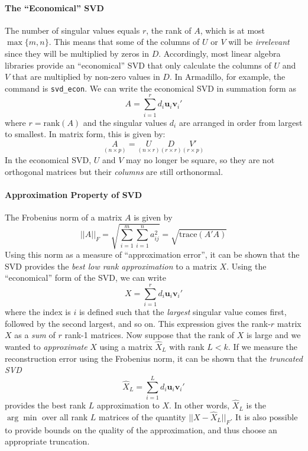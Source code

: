 \paragraph{The ``Economical'' SVD}
The number of singular values equals $r$, the rank of $A$, which is at most $\max\{m,n\}$.
This means that some of the columns of $U$ or $V$ will be \emph{irrelevant} since they will be multiplied by zeros in $D$.
Accordingly, most linear algebra libraries provide an ``economical'' SVD that only calculate the columns of $U$ and $V$ that are multiplied by non-zero values in $D$.
In Armadillo, for example, the command is \texttt{svd\_econ}. 
We can write the economical SVD in summation form as 
	$$A = \sum_{i=1}^r d_i \textbf{u}_i \textbf{v}_i'$$
where $r = \mbox{rank}(A)$ and the singular values $d_i$ are arranged in order from largest to smallest.
In matrix form, this is given by:
	$$\underset{(n\times p)}{A} = \underset{(n\times r)}{U} \underset{(r\times r)}{D} \underset{(r\times p)}{V'}$$
In the economical SVD, $U$ and $V$ may no longer be square, so they are not orthogonal matrices but their \emph{columns} are still orthonormal.


\paragraph{Approximation Property of SVD} The Frobenius norm of a matrix $A$ is given by
	$$||A||_F = \sqrt{\sum_{i=1}^m \sum_{i=1}^n a_{ij}^2} = \sqrt{\mbox{trace}(A'A)}$$
Using this norm as a measure of ``approximation error'', it can be shown that the SVD provides the \emph{best low rank approximation} to a matrix $X$. 
Using the ``economical'' form of the SVD, we can write
	$$X = \sum_{i=1}^r d_i \textbf{u}_i \textbf{v}_i'$$
where the index is $i$ is defined such that the \emph{largest} singular value comes first, followed by the second largest, and so on.
This expression gives the rank-$r$ matrix $X$ as a \emph{sum} of $r$ rank-1 matrices.
Now suppose that the rank of $X$ is large and we wanted to \emph{approximate} $X$ using a matrix $\widehat{X}_L$ with rank $L<k$.
If we measure the reconstruction error using the Frobenius norm, it can be shown that the \emph{truncated SVD}
	$$\widehat{X}_L = \sum_{i=1}^{L} d_i \textbf{u}_i \textbf{v}_i'$$ 	
provides the best rank $L$ approximation to $X$.
In other words, $\widehat{X}_L$ is the $\arg \min$  over all rank $L$ matrices of the quantity $||X - \widehat{X}_L||_F$.
It is also possible to provide bounds on the quality of the approximation, and thus choose an appropriate truncation. 

